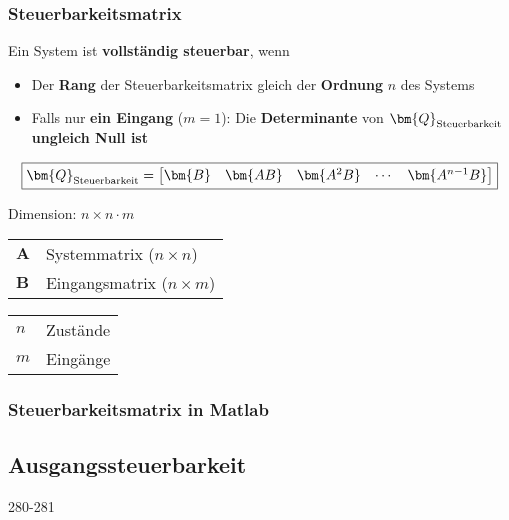 \subsubsection{Steuerbarkeitsmatrix}

Ein System ist \textbf{vollständig steuerbar}, wenn
\begin{itemize}
    \item Der \textbf{Rang} der Steuerbarkeitsmatrix gleich der \textbf{Ordnung} $n$ des Systems
    \item Falls nur \textbf{ein Eingang} ($m = 1$): Die \textbf{Determinante} von $\bm{Q}_{\rm Steuerbarkeit}$ 
        \textbf{ungleich Null ist}
\end{itemize}

\begin{minipage}[c]{0.6\columnwidth}
    $$ \boxed{ \bm{Q}_{\rm Steuerbarkeit} = 
    \begin{bmatrix}
        \bm{B} & \bm{A B} & \bm{A^2 B} & \cdots & \bm{A^{n-1} B} 
    \end{bmatrix} } $$
\end{minipage}
\hfill
\begin{minipage}[c]{0.38\columnwidth}
    Dimension: $n \times n \cdot m$
\end{minipage}


\begin{minipage}[c]{0.48\columnwidth}
    \begin{tabular}{ll}
        $\bm{A}$    & Systemmatrix ($n \times n$) \\
        $\bm{B}$    & Eingangsmatrix ($n \times m$) \\
    \end{tabular}
\end{minipage}
\hfill
\begin{minipage}[c]{0.48\columnwidth}
    \begin{tabular}{ll}
        $n$         & Zustände \\
        $m$         & Eingänge \\
    \end{tabular}
\end{minipage}


\subsubsection*{Steuerbarkeitsmatrix in Matlab}



\subsection{Ausgangssteuerbarkeit}{280-281}

